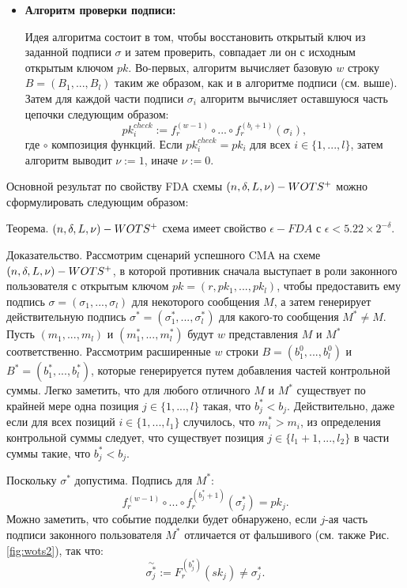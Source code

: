 \documentclass[a4paper, 14pt]{extarticle}
\begin{document}
\begin{itemize}
    \item \textbf{Алгоритм проверки подписи:}

    Идея алгоритма состоит в том, чтобы восстановить открытый ключ из заданной подписи $\sigma$ и затем проверить, совпадает ли он с исходным открытым ключом $pk$. Во-первых, алгоритм вычисляет базовую $w$ строку $B = (B_{1}, ..., B_{l})$ таким же образом, как и в алгоритме подписи (см. выше). Затем для каждой части подписи $\sigma_{i}$ алгоритм вычисляет оставшуюся часть цепочки следующим образом:
    \[pk^{check}_{i} := f^{(w - 1)}_{r} \circ ... \circ f^{(b_{i}+1)}_{r}(\sigma_{i}),\]
    где $\circ$ композиция функций. Если $pk^{check}_{i} = pk_{i}$ для всех $i \in \{1, ..., l\}$, затем алгоритм выводит $\nu := 1$, иначе $\nu := 0$.
\end{itemize}

Основной результат по свойству FDA схемы $(n, \delta, L, \nu)-W\-OTS^{+}$ можно сформулировать следующим образом:

Теорема. $(n, \delta, L, \nu)-W\-OTS^{+}$ схема имеет свойство $\epsilon-FDA$ с $\epsilon < 5.22 \times 2^{-\delta}$.

Доказательство. Рассмотрим сценарий успешного CMA на схеме $(n, \delta, L, \nu)-W\-OTS^{+}$, в которой противник сначала выступает в роли законного пользователя с открытым ключом $pk = (r, pk_{1}, ..., pk_{l})$, чтобы предоставить ему подпись $\sigma = (\sigma_{1}, ..., \sigma_{l})$ для некоторого сообщения $M$, а затем генерирует действительную подпись $\sigma^{*} = (\sigma^{*}_{1}, ..., \sigma^{*}_{l})$ для какого-то сообщения $M^{*} \neq M$. Пусть $(m_{1}, ..., m_{l})$ и $(m^{*}_{1}, ..., m^{*}_{l})$ будут $w$ представления $M$ и $M^{*}$ соответственно. Рассмотрим расширенные $w$ строки $B = (b^{0}_{1}, ..., b^{0}_{l})$ и $B^{*} = (b^{*}_{1}, ..., b^{*}_{l})$, которые генерируется путем добавления частей контрольной суммы. Легко заметить, что для любого отличного $M$ и $M^{*}$ существует по крайней мере одна позиция $j \in \{1, ..., l\}$ такая, что $b^{*}_{j} < b_{j}$. Действительно, даже если для всех позиций $i \in \{1, ..., l_{1}\}$ случилось, что $m^{*}_{i} > m_{i}$, из определения контрольной суммы следует, что существует позиция $j \in \{l_{1} + 1, ..., l_{2}\}$ в части суммы такие, что $b^{*}_{j} < b_{j}$.

Поскольку $\sigma^{*}$ допустима. Подпись для $M^{*}$:
\[f^{(w - 1)}_{r} \circ ... \circ f^{(b^{*}_{j} + 1)}_{r}(\sigma^{*}_{j}) = pk_{j}.\]
Можно заметить, что событие подделки будет обнаружено, если $j$-ая часть подписи законного пользователя $M^{*}$ отличается от фальшивого (см. также Рис. \ref{fig:wots2}), так что:
\[\stackrel{\sim}{\sigma^{*}_{j}} := F^{(b^{*}_{j})}_{r}(sk_{j}) \neq \sigma^{*}_{j}.\]
\end{document}
